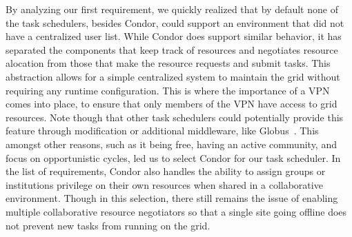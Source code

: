 \documentclass{sig-alternate}
\begin{document}
By analyzing our first requirement, we quickly realized that by default none of
the task schedulers, besides Condor, could support an environment that did not
have a centralized user list.  While Condor does support similar behavior, it has
separated the components that keep track of resources and negotiates resource
alocation from those that make the resource requests and submit tasks.  This
abstraction allows for a simple centralized system to maintain the grid without
requiring any runtime configuration.  This is where the importance of a VPN
comes into place, to ensure that only members of the VPN have access to grid
resources.  Note though that other task schedulers could potentially provide
this feature through modification or additional middleware, like 
Globus~\cite{globus_toolkit}.  This amongst other reasons, such as it being
free, having an active community, and focus on opportunistic cycles, led us to
select Condor for our task scheduler.  In the list of requirements, Condor also
handles the ability to assign groups or institutions privilege on their own
resources when shared in a collaborative environment.  Though in this
selection, there still remains the issue of enabling multiple collaborative
resource negotiators so that a single site going offline does not prevent new
tasks from running on the grid.

\end{document}
